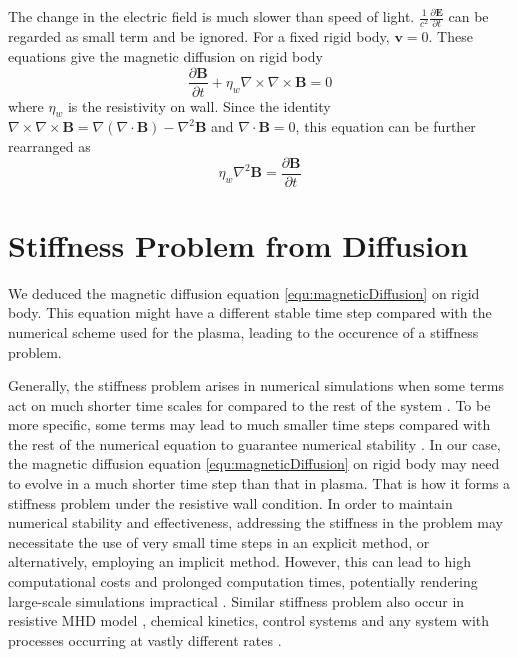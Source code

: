 The change in the electric field is much slower than speed of light. $\frac{1}{c^2}\frac{\partial \mathbf{E}}{\partial t}$ can be regarded as small term and be ignored. For a fixed rigid body, $\mathbf{v}=0$. These equations give the magnetic diffusion on rigid body
\begin{equation}
	\frac{\partial \mathbf{B}}{\partial t}+\eta_{w}\nabla\times\nabla\times\mathbf{B}=0
	\label{equ:magneticDiffusion}
\end{equation} 
where $\eta_w$ is the resistivity on wall. Since the identity $\nabla\times\nabla\times\mathbf{B}=\nabla(\nabla\cdot\mathbf{B})-\nabla^2\mathbf{B}$ and  $\nabla\cdot\mathbf{B}=0$, this equation can be further rearranged as 
\begin{equation}
	\eta_{w}\nabla^2\mathbf{B}=\frac{\partial \mathbf{B}}{\partial t}
	\label{equ:magneticDiffusion_rearrange}
\end{equation} 
\section{Stiffness Problem from Diffusion}
We deduced the magnetic diffusion equation \ref{equ:magneticDiffusion} on rigid body. This equation might have a different stable time step compared with the numerical scheme used for the plasma, leading to the occurence of a stiffness problem.

Generally, the stiffness problem arises in numerical simulations when some terms act on much shorter time scales for compared to the rest of the system \cite{wright2020resistive}. To be more specific, some terms may lead to much smaller time steps compared with the rest of the numerical equation to guarantee numerical stability \cite{spijker1996stiffness}. In our case, the magnetic diffusion equation \ref{equ:magneticDiffusion} on rigid body may need to evolve in a much shorter time step than that in plasma. That is how it forms a stiffness problem under the resistive wall condition. In order to maintain numerical stability and effectiveness, addressing the stiffness in the problem may necessitate the use of very small time steps in an explicit method, or alternatively, employing an implicit method. However, this can lead to high computational costs and prolonged computation times, potentially rendering large-scale simulations impractical \cite{spijker1996stiffness,wright2020resistive}. Similar stiffness problem also occur in resistive MHD model \cite{wright2020resistive}, chemical kinetics, control systems and any system with processes occurring at vastly different rates \cite{spijker1996stiffness}.     

